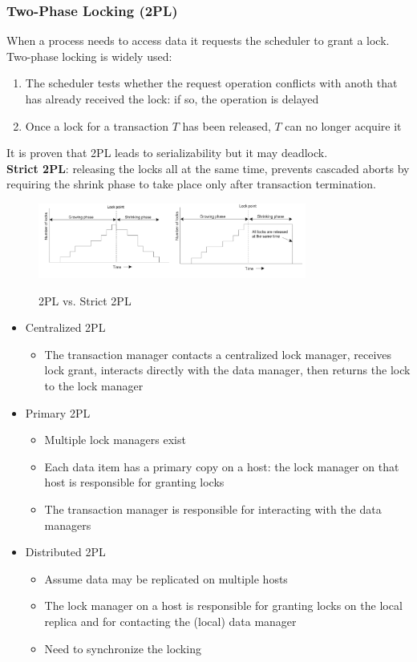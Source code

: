 \documentclass[10pt,a4paper]{article}
\begin{document}
\subsubsection{Two-Phase Locking (2PL)}
When a process needs to access data it requests the scheduler to grant a lock. \\
Two-phase locking is widely used:
\begin{enumerate}
	\item The scheduler tests whether the request operation conflicts with anoth that has already received the lock: if so, the operation is delayed
	\item Once a lock for a transaction $T$ has been released, $T$ can no longer acquire it
\end{enumerate}
It is proven that 2PL leads to serializability but it may deadlock. \\
\textbf{Strict 2PL}: releasing the locks all at the same time, prevents cascaded aborts by requiring the shrink phase to take place only after transaction termination.
\begin{figure}[h!]
 \hfill \includegraphics[width=250pt]{images/2pl.png}\hspace*{\fill}
  \label{fig:2pl}
  \caption{2PL vs. Strict 2PL}
\end{figure} \pagebreak
\begin{itemize}
	\item Centralized 2PL
	\begin{itemize}
		\item The transaction manager contacts a centralized lock manager, receives lock grant, interacts directly with the data manager, then returns the lock to the lock manager
	\end{itemize}
	\item Primary 2PL
	\begin{itemize}
		\item Multiple lock managers exist
		\item Each data item has a primary copy on a host: the lock manager on that host is responsible for granting locks
		\item The transaction manager is responsible for interacting with the data managers
	\end{itemize}
	\item Distributed 2PL
	\begin{itemize}
		\item Assume data may be replicated on multiple hosts
		\item The lock manager on a host is responsible for granting locks on the local replica and for contacting the (local) data manager
		\item Need to synchronize the locking
	\end{itemize}
\end{itemize}
\end{document}
